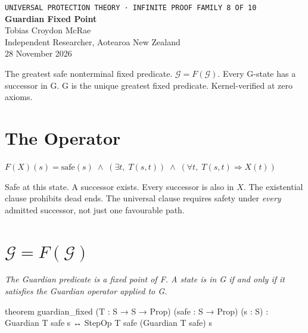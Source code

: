 




\begin{center}
{\small\texttt{UNIVERSAL PROTECTION THEORY · INFINITE PROOF FAMILY 8 OF 10}}\\[1.5em]
{\Huge\bfseries\color{korugreen} Guardian Fixed Point}\\[1em]
{\large Tobias Croydon McRae}\\[0.3em]
{\small Independent Researcher, Aotearoa New Zealand}\\[0.3em]
{\small 28 November 2026}
\end{center}

\bigskip

\noindent The greatest safe nonterminal fixed predicate. $\mathcal{G} = F(\mathcal{G})$. Every G-state has a successor in G. G is the unique greatest fixed predicate. Kernel-verified at zero axioms.

\section{The Operator}

\begin{center}
$F(X)(s) = \mathrm{safe}(s) \;\wedge\; (\exists t,\; T(s,t)) \;\wedge\; (\forall t,\; T(s,t) \Rightarrow X(t))$
\end{center}

Safe at this state. A successor exists. Every successor is also in $X$. The existential clause prohibits dead ends. The universal clause requires safety under \emph{every} admitted successor, not just one favourable path.

\section{$\mathcal{G} = F(\mathcal{G})$}

\begin{theorembox}
\itshape The Guardian predicate is a fixed point of F. A state is in G if and only if it satisfies the Guardian operator applied to G.
\end{theorembox}

\begin{leancode}
theorem guardian_fixed (T : S → S → Prop)
     (safe : S → Prop) (s : S) :
     Guardian T safe s ↔
         StepOp T safe (Guardian T safe) s
\end{leancode}

